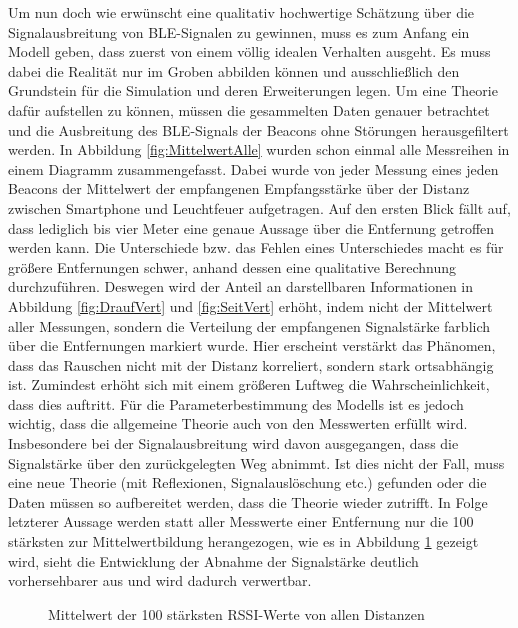 Um nun doch wie erwünscht eine qualitativ hochwertige Schätzung über die Signalausbreitung von BLE-Signalen zu gewinnen, muss es zum Anfang ein Modell geben, dass zuerst von einem völlig idealen Verhalten ausgeht. Es muss dabei die Realität nur im Groben abbilden können und ausschließlich den Grundstein für die Simulation und deren Erweiterungen legen. Um eine Theorie dafür aufstellen zu können, müssen die gesammelten Daten genauer betrachtet und die Ausbreitung des BLE-Signals der Beacons ohne Störungen herausgefiltert werden. In Abbildung \ref{fig:MittelwertAlle} wurden schon einmal alle Messreihen in einem Diagramm zusammengefasst. Dabei wurde von jeder Messung eines jeden Beacons der Mittelwert der empfangenen Empfangsstärke über der Distanz zwischen Smartphone und Leuchtfeuer aufgetragen. Auf den ersten Blick fällt auf, dass lediglich bis vier Meter eine genaue Aussage über die Entfernung getroffen werden kann. Die Unterschiede bzw. das Fehlen eines Unterschiedes macht es für größere Entfernungen schwer, anhand dessen eine qualitative Berechnung durchzuführen. Deswegen wird der Anteil an darstellbaren Informationen in Abbildung \ref{fig:DraufVert} und \ref{fig:SeitVert} erhöht, indem nicht der Mittelwert aller Messungen, sondern die Verteilung der empfangenen Signalstärke farblich über die Entfernungen markiert wurde. Hier erscheint verstärkt das Phänomen, dass das Rauschen nicht mit der Distanz korreliert, sondern stark ortsabhängig ist. Zumindest erhöht sich mit einem größeren Luftweg die Wahrscheinlichkeit, dass dies auftritt. Für die Parameterbestimmung des Modells ist es jedoch wichtig, dass die allgemeine Theorie auch von den Messwerten erfüllt wird. Insbesondere bei der Signalausbreitung wird davon ausgegangen, dass die Signalstärke über den zurückgelegten Weg abnimmt. Ist dies nicht der Fall, muss eine neue Theorie (mit Reflexionen, Signalauslöschung etc.) gefunden oder die Daten müssen so aufbereitet werden, dass die Theorie wieder zutrifft. In Folge letzterer Aussage werden statt aller Messwerte einer Entfernung nur die 100 stärksten zur Mittelwertbildung herangezogen, wie es in Abbildung \ref{fig:Mittelwert100} gezeigt wird, sieht die Entwicklung der Abnahme der Signalstärke deutlich vorhersehbarer aus und wird dadurch verwertbar.
\begin{figure}[H] 
\centering
{}
\caption{Mittelwert der 100 stärksten RSSI-Werte von allen Distanzen}
\label{fig:Mittelwert100}
\end{figure}
